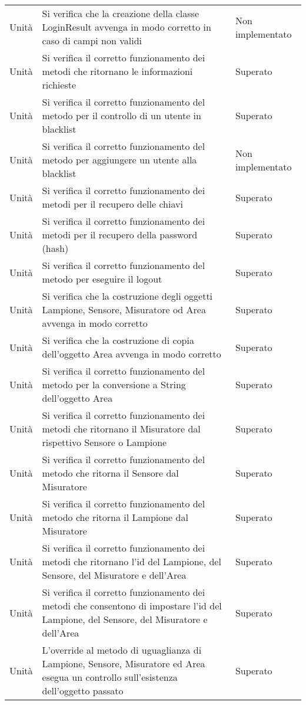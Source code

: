 \begin{center}
\begin{xltabular}{\linewidth}{|l|X|l|}
        Unità & Si verifica che la creazione della classe LoginResult avvenga in modo corretto in caso di campi non validi & Non implementato\\
        Unità & Si verifica il corretto funzionamento dei metodi che ritornano le informazioni richieste & Superato\\
        Unità & Si verifica il corretto funzionamento del metodo per il controllo di un utente in blacklist & Superato\\
        Unità & Si verifica il corretto funzionamento del metodo per aggiungere un utente alla blacklist & Non implementato\\
        Unità & Si verifica il corretto funzionamento dei metodi per il recupero delle chiavi & Superato\\
        Unità & Si verifica il corretto funzionamento dei metodi per il recupero della password (hash) & Superato\\
        Unità & Si verifica il corretto funzionamento del metodo per eseguire il logout & Superato\\
        Unità & Si verifica che la costruzione degli oggetti Lampione, Sensore, Misuratore od Area avvenga in modo corretto & Superato\\
        Unità & Si verifica che la costruzione di copia dell'oggetto Area avvenga in modo corretto & Superato\\
        Unità & Si verifica il corretto funzionamento del metodo per la conversione a String dell'oggetto Area & Superato\\
        Unità & Si verifica il corretto funzionamento dei metodi che ritornano il Misuratore dal rispettivo Sensore o Lampione & Superato\\
        Unità & Si verifica il corretto funzionamento del metodo che ritorna il Sensore dal Misuratore & Superato\\
        Unità & Si verifica il corretto funzionamento del metodo che ritorna il Lampione dal Misuratore & Superato\\
        Unità & Si verifica il corretto funzionamento dei metodi che ritornano l'id del Lampione, del Sensore, del Misuratore e dell'Area & Superato\\
        Unità & Si verifica il corretto funzionamento dei metodi che consentono di impostare l'id del Lampione, del Sensore, del Misuratore e dell'Area & Superato\\
        Unità & L'override al metodo di uguaglianza di Lampione, Sensore, Misuratore ed Area esegua un controllo sull'esistenza dell'oggetto passato & Superato\\

\end{xltabular}
\end{center}
